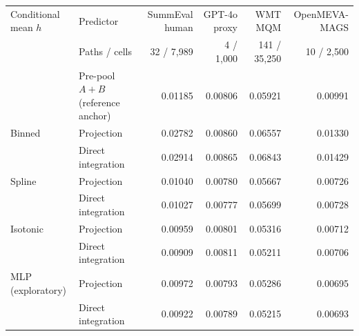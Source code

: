 \begin{tabular}{llrrrr}
\toprule
Conditional mean $h$ & Predictor & SummEval human & GPT-4o proxy & WMT MQM & OpenMEVA-MAGS \\
 & Paths / cells & 32 / 7,989 & 4 / 1,000 & 141 / 35,250 & 10 / 2,500 \\
\midrule
 & Pre-pool $A{+}B$ (reference anchor) & 0.01185 & 0.00806 & 0.05921 & 0.00991 \\
\midrule
Binned & Projection & 0.02782 & 0.00860 & 0.06557 & 0.01330 \\
 & Direct integration & 0.02914 & 0.00865 & 0.06843 & 0.01429 \\
\midrule
Spline & Projection & 0.01040 & 0.00780 & 0.05667 & 0.00726 \\
 & Direct integration & 0.01027 & 0.00777 & 0.05699 & 0.00728 \\
\midrule
Isotonic & Projection & 0.00959 & 0.00801 & 0.05316 & 0.00712 \\
 & Direct integration & 0.00909 & 0.00811 & 0.05211 & 0.00706 \\
\midrule
MLP (exploratory) & Projection & 0.00972 & 0.00793 & 0.05286 & 0.00695 \\
 & Direct integration & 0.00922 & 0.00789 & 0.05215 & 0.00693 \\
\bottomrule
\end{tabular}
